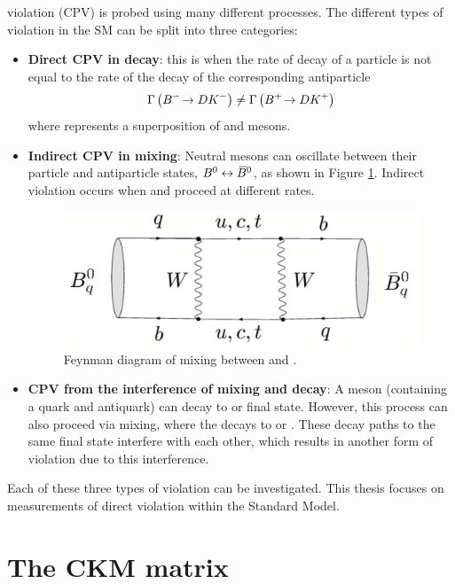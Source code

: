 \CP violation (CPV) is probed using many different processes. The different types of \CP violation in the SM can be split into three categories:
\begin{itemize}
\item \textbf{Direct CPV in decay}: this is when the rate of decay of a particle is not equal to the rate of the decay of the corresponding antiparticle \eg
\begin{equation*}
\Gamma\left({{{B}^-}}\!\rightarrow {\ensuremath{D}}{\ensuremath{{K}^-}}\right) \neq \Gamma\left({{{B}^+}}\!\rightarrow {\ensuremath{D}}{\ensuremath{{K}^+}}\right)
\end{equation*}
where \D represents a  superposition of \Dz and \Dzb mesons.
\item \textbf{Indirect CPV in mixing}: Neutral mesons can oscillate between their particle and antiparticle states, ${{B}^0} \leftrightarrow {\ensuremath{{\kern 0.18em\overline{\kern -0.18em B}{}}{}^0}}$, as shown in Figure \ref{mixing}. Indirect \CP violation occurs when \decay{\Bz}{\Bzb} and \decay{\Bzb}{\Bz} proceed at different rates. 
\begin{figure}[h]
\centering
\includegraphics[width=0.5\linewidth]{figures/theory/mixing.pdf}
\caption{Feynman diagram of mixing between \Bz and \Bzb.}
\label{mixing}
\end{figure}
\item \textbf{CPV from the interference of mixing and decay}: A \Bs meson (containing a \bquark quark and \squark antiquark) can decay to \Dsm\Kp or \Dsp\Km final state. However, this process can also proceed via \decay{\Bs}{\Bsb} mixing, where the \Bsb decays to \Dsm\Kp or \Dsp\Km. These decay paths to the same final state interfere with each other, which results in another form of \CP violation due to this interference.
\end{itemize} 

Each of these three types of \CP violation can be investigated. This thesis focuses on measurements of direct \CP violation within the Standard Model.

\section{The CKM matrix}

